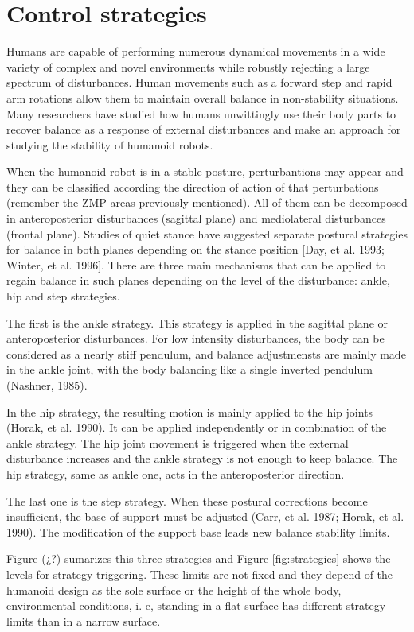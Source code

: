 \section{Control strategies}
Humans are capable of performing numerous dynamical movements in a wide variety of complex and novel environments while robustly rejecting a large spectrum of disturbances. Human movements such as a forward step and rapid arm rotations allow them to maintain overall balance in non-stability situations. Many researchers have studied how humans unwittingly use their body parts to recover balance as a response of external disturbances and make an approach for studying the stability of humanoid robots.

When the humanoid robot is in a stable posture, perturbantions may appear and they can be classified according the direction of action of that perturbations (remember the ZMP areas previously mentioned). All of them can be decomposed in anteroposterior disturbances (sagittal plane) and mediolateral disturbances (frontal plane). Studies of quiet stance have suggested separate postural strategies for balance in both planes depending on the stance position [Day, et al. 1993; Winter, et al. 1996]. There are three main mechanisms that can be applied to regain balance in such planes depending on the level of the disturbance: ankle, hip and step strategies.

The first is the ankle strategy. This strategy is applied in the sagittal plane or anteroposterior disturbances. For low intensity disturbances, the body can be considered as a nearly stiff pendulum, and balance adjustmensts are mainly made in the ankle joint, with the body balancing like a single inverted pendulum (Nashner, 1985). 

In the hip strategy, the resulting motion is mainly applied to the hip joints (Horak, et al. 1990). It can be applied independently or in combination of the ankle strategy. The hip joint movement is triggered when the external disturbance increases and the ankle strategy is not enough to keep balance. The hip strategy, same as ankle one, acts in the anteroposterior direction.

The last one is the step strategy. When these postural corrections become insufficient, the base of support must be adjusted (Carr, et al. 1987; Horak, et al. 1990). The modification of the support base leads new balance stability limits.

Figure (¿?) sumarizes this three strategies and Figure \ref{fig:strategies} shows the levels for strategy triggering. These limits are not fixed and they depend of the humanoid design as the sole surface or the height of the whole body, environmental conditions, i. e, standing in a flat surface has different strategy limits than in a narrow surface.

